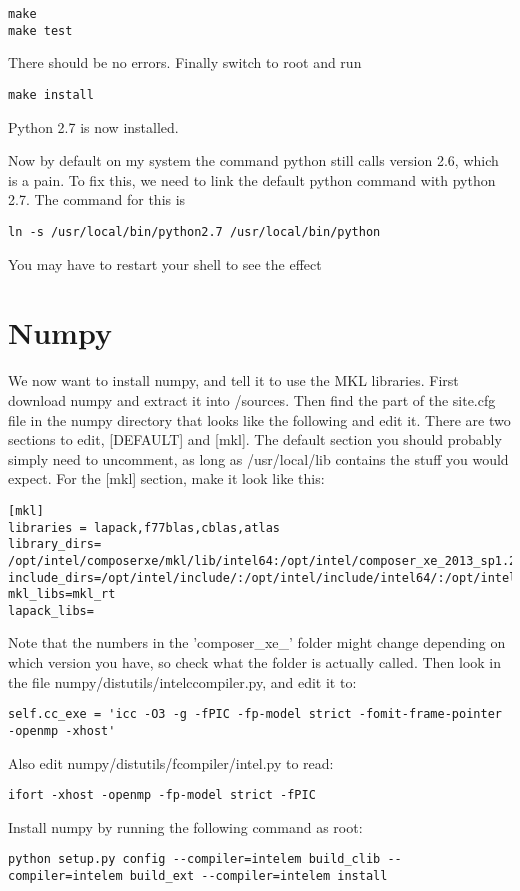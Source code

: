 \begin{verbatim}
make
make test
\end{verbatim}
There should be no errors. Finally switch to root and run
\begin{verbatim}
make install
\end{verbatim}
Python 2.7 is now installed.

Now by default on my system the command python still calls version 2.6, which is a pain. To fix this, we need to link the default python command with python 2.7. The command for this is 
\begin{verbatim}
ln -s /usr/local/bin/python2.7 /usr/local/bin/python
\end{verbatim}
You may have to restart your shell to see the effect


\section{Numpy}
We now want to install numpy, and tell it to use the MKL libraries. First download numpy and extract it into /sources. Then find the part of the site.cfg file in the numpy directory that looks like the following and edit it. There are two sections to edit, [DEFAULT] and [mkl]. The default section you should probably simply need to uncomment, as long as /usr/local/lib contains the stuff you would expect. For the [mkl] section, make it look like this:
\begin{verbatim}
[mkl]
libraries = lapack,f77blas,cblas,atlas
library_dirs= /opt/intel/composerxe/mkl/lib/intel64:/opt/intel/composer_xe_2013_sp1.2.144/mkl/lib/intel64
include_dirs=/opt/intel/include/:/opt/intel/include/intel64/:/opt/intel/mkl/include
mkl_libs=mkl_rt
lapack_libs=
\end{verbatim}
Note that the numbers in the 'composer\_xe\_' folder might change depending on which version you have, so check what the folder is actually called.
Then look in the file numpy/distutils/intelccompiler.py, and edit it to:
\begin{verbatim}
self.cc_exe = 'icc -O3 -g -fPIC -fp-model strict -fomit-frame-pointer -openmp -xhost' 
\end{verbatim}
Also edit numpy/distutils/fcompiler/intel.py to read:
\begin{verbatim}
ifort -xhost -openmp -fp-model strict -fPIC
\end{verbatim}
Install numpy by running the following command as root:
\begin{verbatim}
python setup.py config --compiler=intelem build_clib --compiler=intelem build_ext --compiler=intelem install
\end{verbatim}
